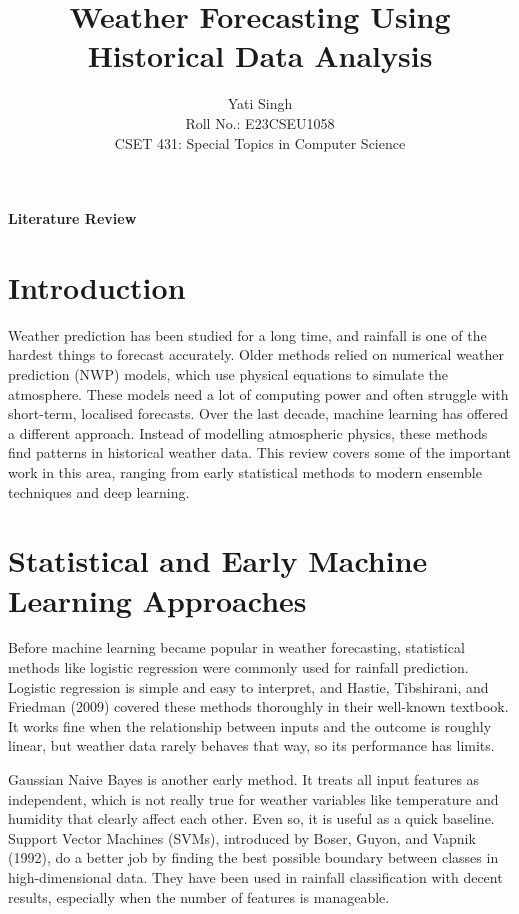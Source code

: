 \documentclass[12pt,a4paper]{article}
\title{\LARGE\textbf{Weather Forecasting Using Historical Data Analysis}}
\author{Yati Singh \\ Roll No.: E23CSEU1058 \\ CSET 431: Special Topics in Computer Science}
\date{}
\begin{document}
\maketitle

\begin{center}
  {\large\textbf{Literature Review}}
\end{center}

\vspace{0.5em}

\section*{Introduction}

Weather prediction has been studied for a long time, and rainfall is one of the hardest things to forecast accurately. Older methods relied on numerical weather prediction (NWP) models, which use physical equations to simulate the atmosphere. These models need a lot of computing power and often struggle with short-term, localised forecasts. Over the last decade, machine learning has offered a different approach. Instead of modelling atmospheric physics, these methods find patterns in historical weather data. This review covers some of the important work in this area, ranging from early statistical methods to modern ensemble techniques and deep learning.

\section*{Statistical and Early Machine Learning Approaches}

Before machine learning became popular in weather forecasting, statistical methods like logistic regression were commonly used for rainfall prediction. Logistic regression is simple and easy to interpret, and Hastie, Tibshirani, and Friedman (2009) covered these methods thoroughly in their well-known textbook. It works fine when the relationship between inputs and the outcome is roughly linear, but weather data rarely behaves that way, so its performance has limits.

Gaussian Naive Bayes is another early method. It treats all input features as independent, which is not really true for weather variables like temperature and humidity that clearly affect each other. Even so, it is useful as a quick baseline. Support Vector Machines (SVMs), introduced by Boser, Guyon, and Vapnik (1992), do a better job by finding the best possible boundary between classes in high-dimensional data. They have been used in rainfall classification with decent results, especially when the number of features is manageable.
\end{document}
